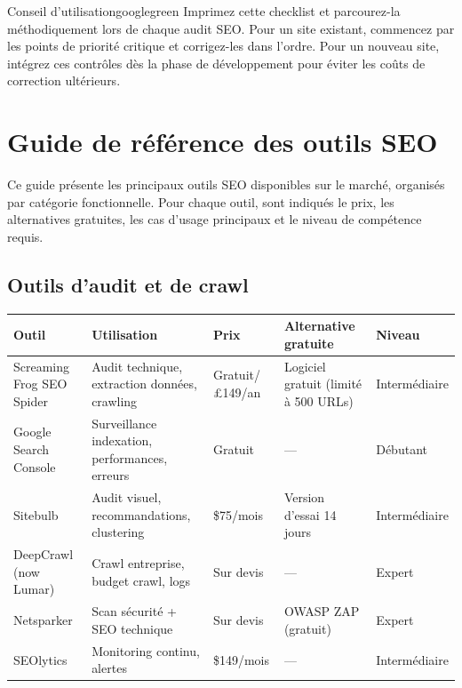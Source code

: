 \documentclass[12pt,a4paper,twoside]{report}
\begin{document}
\vspace{0.5cm}
\begin{mybox}{Conseil d'utilisation}{googlegreen}
Imprimez cette checklist et parcourez-la méthodiquement lors de chaque audit SEO. Pour un site existant, commencez par les points de priorité critique et corrigez-les dans l'ordre. Pour un nouveau site, intégrez ces contrôles dès la phase de développement pour éviter les coûts de correction ultérieurs.
\end{mybox}

\newpage
\chapter{Guide de référence des outils SEO}
\label{app:tools}

Ce guide présente les principaux outils SEO disponibles sur le marché, organisés par catégorie fonctionnelle. Pour chaque outil, sont indiqués le prix, les alternatives gratuites, les cas d'usage principaux et le niveau de compétence requis.

\section*{Outils d'audit et de crawl}

\begin{center}
\begin{tabularx}{\textwidth}{|p{3cm}|X|p{2cm}|p{2.5cm}|p{1.8cm}|}
\hline
\textbf{Outil} & \textbf{Utilisation} & \textbf{Prix} & \textbf{Alternative gratuite} & \textbf{Niveau} \\
\hline
Screaming Frog SEO Spider & Audit technique, extraction données, crawling & Gratuit/£149/an & Logiciel gratuit (limité à 500 URLs) & Intermédiaire \\
\hline
Google Search Console & Surveillance indexation, performances, erreurs & Gratuit & — & Débutant \\
\hline
Sitebulb & Audit visuel, recommandations, clustering & \$75/mois & Version d'essai 14 jours & Intermédiaire \\
\hline
DeepCrawl (now Lumar) & Crawl entreprise, budget crawl, logs & Sur devis & — & Expert \\
\hline
Netsparker & Scan sécurité + SEO technique & Sur devis & OWASP ZAP (gratuit) & Expert \\
\hline
SEOlytics & Monitoring continu, alertes & \$149/mois & — & Intermédiaire \\
\hline
\bottomrule
\end{tabularx}
\end{center}
\end{document}
